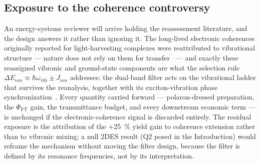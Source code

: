 \documentclass[preprint,12pt]{elsarticle}
\begin{document}
\subsection{Exposure to the coherence controversy}
An energy-systems reviewer will arrive holding the reassessment literature, and the design answers it rather than ignoring it. The long-lived electronic coherences originally reported for light-harvesting complexes were reattributed to vibrational structure --- nature does not rely on them for transfer~\cite{Duan2017} --- and exactly these reassigned vibronic and ground-state components are what the selection rule $\Delta E_{nm} \approx \hbar\omega_{\mathrm{vib}} \pm J_{nm}$ addresses: the dual-band filter acts on the vibrational ladder that survives the reanalysis, together with its exciton-vibration phase synchronization~\cite{Zhu2024}. Every quantity carried forward --- polaron-dressed preparation, the $\Phi_{\mathrm{FT}}$ gain, the transmittance budget, and every downstream economic term --- is unchanged if the electronic-coherence signal is discarded entirely. The residual exposure is the attribution of the +\qty{25}{\percent} yield gain to coherence extension rather than to vibronic mixing; a null 2DES result (Q2 posed in the Introduction) would reframe the mechanism without moving the filter design, because the filter is defined by its resonance frequencies, not by its interpretation.
\end{document}
